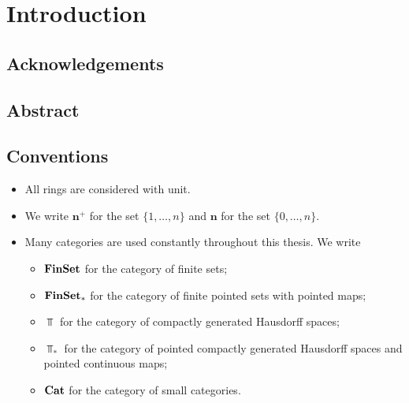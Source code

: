\section{Introduction}
\subsection{Acknowledgements}
\subsection{Abstract}
\subsection{Conventions}
\begin{itemize}
    \item All rings are considered with unit.
    \item We write $\textbf{n}^+$ for the set $\{1, \ldots, n\}$ and $\textbf{n}$ for the set $\{0, \ldots, n\}$.
    \item Many categories are used constantly throughout this thesis. We write
    \begin{itemize}
        \item $\textbf{FinSet}$ for the category of finite sets;
        \item $\textbf{FinSet}_*$ for the category of finite pointed sets with pointed maps;
        \item $\Top$ for the category of compactly generated Hausdorff spaces;
        \item $\Top_*$ for the category of pointed compactly generated Hausdorff spaces and pointed continuous maps;
        \item $\textbf{Cat}$ for the category of small categories.
    \end{itemize}
\end{itemize}